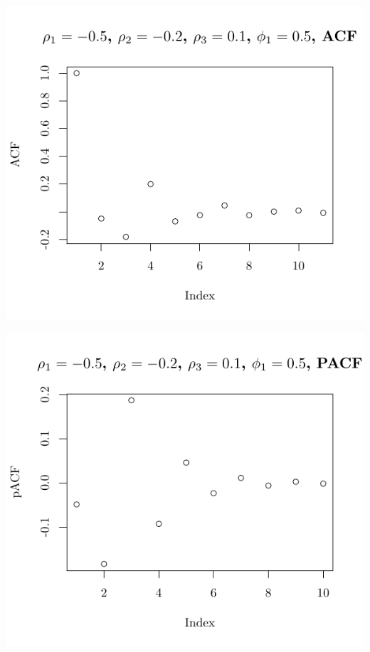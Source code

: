 \documentclass[10pt]{paper}\usepackage[]{graphicx}\usepackage[]{color}
\makeatletter
\def\maxwidth{ %
  \ifdim\Gin@nat@width>\linewidth
    \linewidth
  \else
    \Gin@nat@width
  \fi
}
\newenvironment{knitrout}{}{} %
\makeatother
\begin{document}
\begin{knitrout}
{\centering \includegraphics[width=\maxwidth]{figure/graphics-plotter-119} 

}




{\centering \includegraphics[width=\maxwidth]{figure/graphics-plotter-120} 

}





\end{knitrout}
\end{document}
